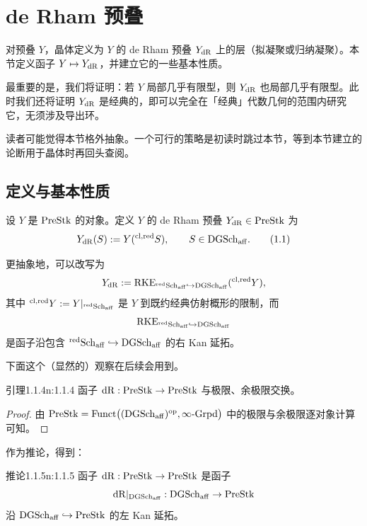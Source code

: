 \chapter{de Rham 预叠}

对预叠 $Y$，晶体定义为 $Y$ 的 de Rham 预叠 $Y_{\mathrm{dR}}$ 上的层（拟凝聚或归纳凝聚）。本节定义函子 $Y\mapsto Y_{\mathrm{dR}}$，并建立它的一些基本性质。

最重要的是，我们将证明：若 $Y$ 局部几乎有限型，则 $Y_{\mathrm{dR}}$ 也局部几乎有限型。此时我们还将证明 $Y_{\mathrm{dR}}$ 是经典的，即可以完全在「经典」代数几何的范围内研究它，无须涉及导出环。

读者可能觉得本节格外抽象。一个可行的策略是初读时跳过本节，等到本节建立的论断用于晶体时再回头查阅。

\section{定义与基本性质}

设 $Y$ 是 $\mathrm{PreStk}$ 的对象。定义 $Y$ 的 de Rham 预叠 $Y_{\mathrm{dR}}\in\mathrm{PreStk}$ 为
\begin{equation}
Y_{\mathrm{dR}}(S):=Y(^{\mathrm{cl,red}} S),\qquad S\in\mathrm{DGSch}_{\mathrm{aff}}.\tag{1.1}
\end{equation}

更抽象地，可以改写为
\[
Y_{\mathrm{dR}}:=\mathrm{RKE}_{{}^{\mathrm{red}}\mathrm{Sch}_{\mathrm{aff}}\hookrightarrow\mathrm{DGSch}_{\mathrm{aff}}}(^{\mathrm{cl,red}} Y),
\]
其中 $^{\mathrm{cl,red}} Y:=Y|_{{}^{\mathrm{red}}\mathrm{Sch}_{\mathrm{aff}}}$ 是 $Y$ 到既约经典仿射概形的限制，而
\[
\mathrm{RKE}_{{}^{\mathrm{red}}\mathrm{Sch}_{\mathrm{aff}}\hookrightarrow\mathrm{DGSch}_{\mathrm{aff}}}
\]
是函子沿包含 ${}^{\mathrm{red}}\mathrm{Sch}_{\mathrm{aff}}\hookrightarrow\mathrm{DGSch}_{\mathrm{aff}}$ 的右 Kan 延拓。

下面这个（显然的）观察在后续会用到。

\begin{othm}{引理}{1.1.4}{n:1.1.4}
函子 $\mathrm{dR}:\mathrm{PreStk}\to\mathrm{PreStk}$ 与极限、余极限交换。
\end{othm}

\begin{proof}
由 $\mathrm{PreStk}=\mathrm{Funct}\big((\mathrm{DGSch}_{\mathrm{aff}})^{\mathrm{op}},\infty\text{-}\mathrm{Grpd}\big)$ 中的极限与余极限逐对象计算可知。
\end{proof}

作为推论，得到：

\begin{othm}{推论}{1.1.5}{n:1.1.5}
函子 $\mathrm{dR}:\mathrm{PreStk}\to\mathrm{PreStk}$ 是函子
\[
\mathrm{dR}|_{\mathrm{DGSch}_{\mathrm{aff}}}:\mathrm{DGSch}_{\mathrm{aff}}\to\mathrm{PreStk}
\]
沿 $\mathrm{DGSch}_{\mathrm{aff}}\hookrightarrow\mathrm{PreStk}$ 的左 Kan 延拓。
\end{othm}

